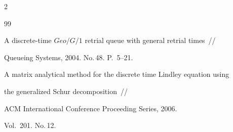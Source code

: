 \begin{multicols}{2}
{{\begin{thebibliography}{99}


A discrete-time $Geo/G/1$ retrial queue with general retrial times~//


Queueing Systems, 2004. No.\,48. P.~5--21.









A matrix analytical method for the discrete time Lindley equation using


the generalized Schur decomposition~//


ACM International Conference Proceeding Series, 2006.


Vol.~201. No.\,12.





\end{thebibliography}


\label{end\stat}


} 


}


\end{multicols}


